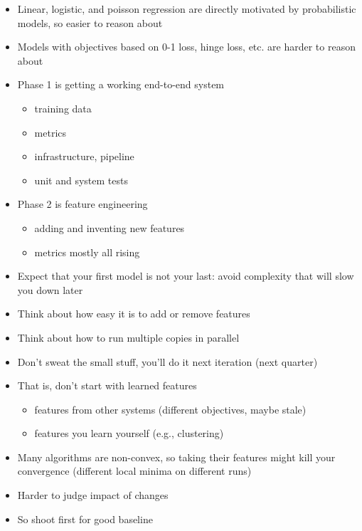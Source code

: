 
\begin{itemize}
\item Linear, logistic, and poisson regression are directly motivated
  by probabilistic models, so easier to reason about
\item Models with objectives based on 0-1 loss, hinge loss, etc. are
  harder to reason about
\end{itemize}


\begin{itemize}
\item Phase 1 is getting a working end-to-end system
  \begin{itemize}
  \item training data
  \item metrics
  \item infrastructure, pipeline
  \item unit and system tests
  \end{itemize}
\item Phase 2 is feature engineering
  \begin{itemize}
  \item adding and inventing new features
  \item metrics mostly all rising
  \end{itemize}
\end{itemize}


\begin{itemize}
\item Expect that your first model is not your last: avoid complexity
  that will slow you down later
\item Think about how easy it is to add or remove features
\item Think about how to run multiple copies in parallel
\item Don't sweat the small stuff, you'll do it next iteration (next quarter)
\end{itemize}


\begin{itemize}
\item That is, don't start with learned features
  \begin{itemize}
  \item features from other systems (different objectives, maybe stale)
  \item features you learn yourself (e.g., clustering)
  \end{itemize}
\item Many algorithms are non-convex, so taking their features might
  kill your convergence (different local minima on different runs)
\item Harder to judge impact of changes
\item So shoot first for good baseline
\end{itemize}

